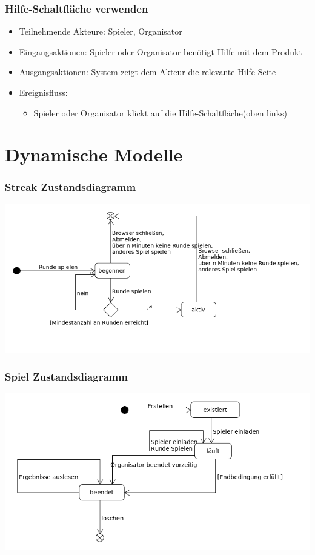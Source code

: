 \documentclass[a4paper]{scrreprt}
\begin{document}
       \subsection{Hilfe-Schaltfläche verwenden}
    \begin{itemize}
        \item Teilnehmende Akteure: \Gls{Spieler}, \Gls{Organisator}
        \item Eingangsaktionen: Spieler oder Organisator benötigt Hilfe mit dem Produkt
        \item Ausgangsaktionen: System zeigt dem Akteur die relevante Hilfe Seite
        \item Ereignisfluss:
            \begin{itemize}
                \item Spieler oder Organisator klickt auf die Hilfe-Schaltfläche(oben links)
            \end{itemize}
    \end{itemize}


    \chapter{Dynamische Modelle}
    \subsection{Streak Zustandsdiagramm}
    \label{fig:Streak_State}
    \includegraphics[width=\textwidth]{uml/export/Streak_Zustand.png}
    \subsection{Spiel Zustandsdiagramm}
    \label{fig:Spiel_State}
    \includegraphics[width=\textwidth]{uml/export/Spiel_Zustand.png}
\end{document}
